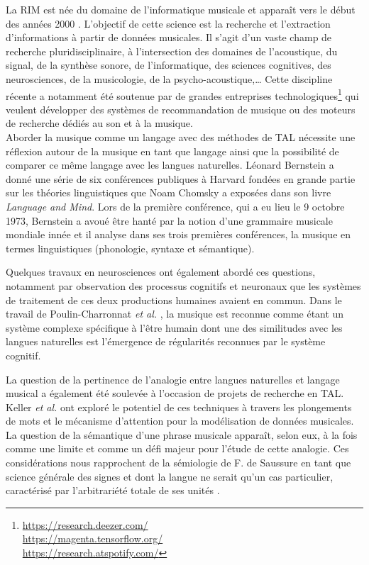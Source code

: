 La RIM est née du domaine de l’informatique musicale et apparaît vers le début
des années 2000 \cite{MIR_1}. L’objectif de cette science est la recherche et
l’extraction d’informations à partir de données musicales. Il s’agit d’un vaste
champ de recherche pluridisciplinaire, à l’intersection des domaines de
l’acoustique, du signal, de la synthèse sonore, de l’informatique, des sciences
cognitives, des neurosciences, de la musicologie, de la psycho-acoustique,…
Cette discipline récente a notamment été soutenue par
de grandes entreprises technologiques\footnote{\url{
https://research.deezer.com/}\\\url{https://magenta.tensorflow.org/}\\\url{
https://research.atspotify.com/}} qui veulent développer des systèmes de
recommandation de musique ou des moteurs de recherche dédiés au son et à la
musique.\\

Aborder la musique comme un langage avec des méthodes de TAL nécessite une
réflexion autour de la musique en tant que langage ainsi que la possibilité de
comparer ce même langage avec les langues naturelles. Léonard Bernstein
\cite{lbernstein} a donné une série de six conférences publiques à Harvard
fondées en grande partie sur les théories linguistiques que Noam Chomsky a
exposées dans son livre \textit{Language and Mind}. Lors de la première conférence,
qui a eu lieu le 9 octobre 1973, Bernstein a avoué être hanté par la notion
d’une grammaire musicale mondiale innée et il analyse dans ses trois premières
conférences, la musique en termes linguistiques (phonologie, syntaxe et
sémantique).

Quelques travaux en neurosciences ont également abordé ces questions, notamment
par observation des processus cognitifs et neuronaux que les systèmes de
traitement de ces deux productions humaines avaient en commun. Dans le travail
de Poulin-Charronnat \textit{et al.} \cite{poulincharronnat}, la musique est
reconnue comme étant un système complexe spécifique à l’être humain dont une
des similitudes avec les langues naturelles est l’émergence de régularités
reconnues par le système cognitif.

La question de la pertinence de l’analogie entre langues naturelles et langage
musical a également été soulevée à l’occasion de projets de recherche en TAL.
Keller \textit{et al.} \cite{keller} ont exploré le potentiel de
ces techniques à travers les plongements de mots et le mécanisme d’attention
pour la modélisation de données musicales. La question de la sémantique d’une
phrase musicale apparaît, selon eux, à la fois comme une limite et comme un défi
majeur pour l’étude de cette analogie. Ces considérations nous rapprochent de la
sémiologie de F. de Saussure en tant que science générale des signes et dont la
langue ne serait qu’un cas particulier, caractérisé par l’arbitrariété totale
de ses unités \cite{wunderli2017ferdinand}.


